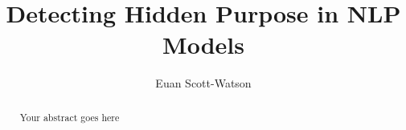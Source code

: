 \documentclass[a4paper, twoside]{report}
\title{Detecting Hidden Purpose in NLP Models}
\author{Euan Scott-Watson}
\begin{document}


\begin{abstract}
Your abstract goes here
\end{abstract}

\tableofcontents
\listoffigures
\listoftables









\end{document}
